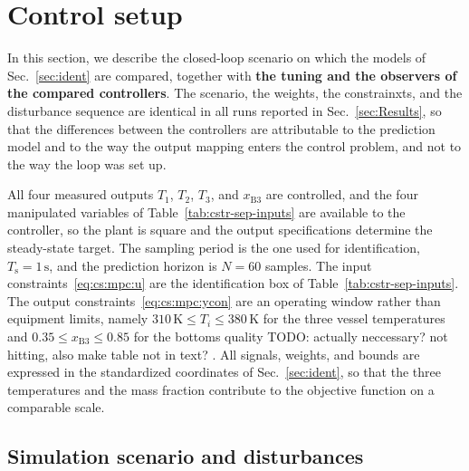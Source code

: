 \documentclass[preprint,12pt,authoryear]{elsarticle}
\newcommand{\generatedstyle}{\color{generated}\bfseries\boldmath}
\newcommand{\textgenerated}[1]{\textcolor{generated}{\bfseries\boldmath #1}}
\newcommand{\gensource}{grok4.6high}
\newcommand{\genopen}{{\scriptsize\generatedstyle[\gensource]}}
\newcommand{\genclose}{{\scriptsize\generatedstyle[/\gensource]}}
\theoremstyle{remark}
\newcommand{\ui}[2]{#1_{\text{#2}}}
\newcommand{\Ts}{\ui{T}{s}}
\newcommand{\todo}[1]{{{\color{red} TODO: #1	}} }
\begin{document}
\section{Control setup}
\label{sec:control-setup}

In this section, we describe the closed-loop scenario on which the models of Sec.~\ref{sec:ident} are compared, together with {\renewcommand{\gensource}{claude-opus-5.5}\textgenerated{\genopen{} the tuning and the observers of the compared controllers\genclose}}. The scenario, the weights, the constrainxts, and the disturbance sequence are identical in all runs reported in Sec.~\ref{sec:Results}, so that the differences between the controllers are attributable to the prediction model and to the way the output mapping enters the control problem, and not to the way the loop was set up.

All four measured outputs $T_1$, $T_2$, $T_3$, and $x_{\text{B}3}$ are controlled, and the four manipulated variables of Table~\ref{tab:cstr-sep-inputs} are available to the controller, so the plant is square and the output specifications determine the steady-state target. The sampling period is the one used for identification, $\Ts = 1\,\text{s}$, and the prediction horizon is $N = 60$ samples. The input constraints~\eqref{eq:cs:mpc:u} are the identification box of Table~\ref{tab:cstr-sep-inputs}. The output constraints~\eqref{eq:cs:mpc:ycon} are an operating window rather than equipment limits, namely $310\,\text{K} \leq T_i \leq 380\,\text{K}$ for the three vessel temperatures and $0.35 \leq x_{\text{B}3} \leq 0.85$ for the bottoms quality\todo{actually neccessary? not hitting, also make table not in text?}. All signals, weights, and bounds are expressed in the standardized coordinates of Sec.~\ref{sec:ident}, so that the three temperatures and the mass fraction contribute to the objective function on a comparable scale.

\subsection{Simulation scenario and disturbances}
\end{document}

